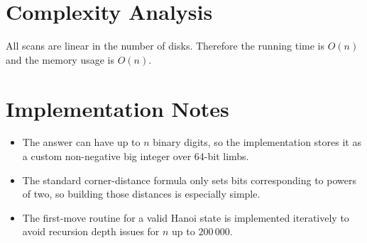 \documentclass[11pt]{article}
\begin{document}
\section*{Complexity Analysis}

All scans are linear in the number of disks. Therefore the running time is $O(n)$ and the memory usage is $O(n)$.

\section*{Implementation Notes}

\begin{itemize}[leftmargin=*]
    \item The answer can have up to $n$ binary digits, so the implementation stores it as a custom non-negative big integer over 64-bit limbs.
    \item The standard corner-distance formula only sets bits corresponding to powers of two, so building those distances is especially simple.
    \item The first-move routine for a valid Hanoi state is implemented iteratively to avoid recursion depth issues for $n$ up to $200\,000$.
\end{itemize}
\end{document}
